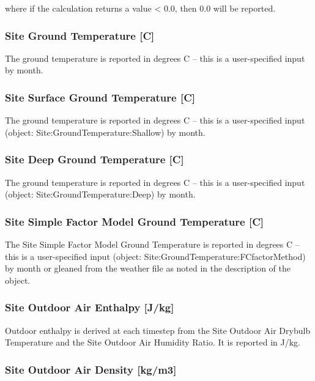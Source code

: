 where if the calculation returns a value \textless{} 0.0, then 0.0 will be reported.

\subsubsection{Site Ground Temperature {[}C{]}}\label{site-ground-temperature-c}

The ground temperature is reported in degrees C -- this is a user-specified input by month.

\subsubsection{Site Surface Ground Temperature {[}C{]}}\label{site-surface-ground-temperature-c}

The ground temperature is reported in degrees C -- this is a user-specified input (object: Site:GroundTemperature:Shallow) by month.

\subsubsection{Site Deep Ground Temperature {[}C{]}}\label{site-deep-ground-temperature-c}

The ground temperature is reported in degrees C -- this is a user-specified input (object: Site:GroundTemperature:Deep) by month.

\subsubsection{Site Simple Factor Model Ground Temperature {[}C{]}}\label{site-simple-factor-model-ground-temperature-c}

The Site Simple Factor Model Ground Temperature is reported in degrees C -- this is a user-specified input (object: Site:GroundTemperature:FCfactorMethod) by month or gleaned from the weather file as noted in the description of the object.

\subsubsection{Site Outdoor Air Enthalpy {[}J/kg{]}}\label{site-outdoor-air-enthalpy-jkg}

Outdoor enthalpy is derived at each timestep from the Site Outdoor Air Drybulb Temperature and the Site Outdoor Air Humidity Ratio. It is reported in J/kg.

\subsubsection{Site Outdoor Air Density {[}kg/m3{]}}\label{site-outdoor-air-density-kgm3}

